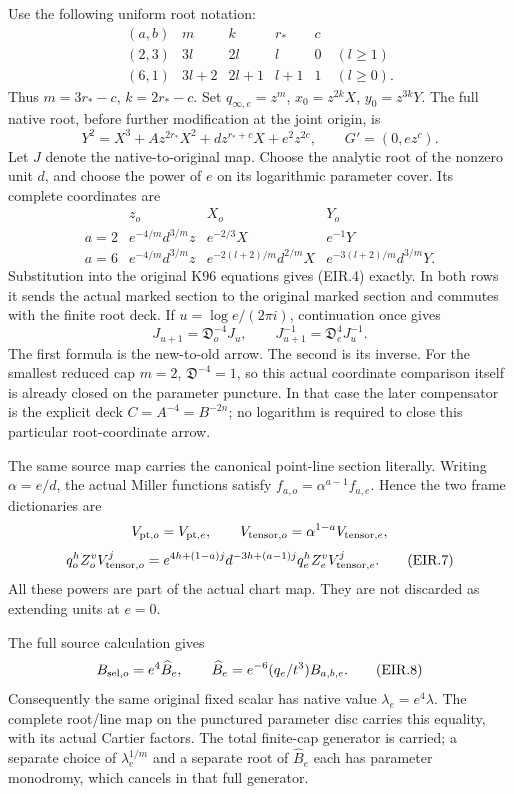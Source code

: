 Use the following uniform root notation:
\[
 \begin{array}{c|cccc}
 (a,b)&m&k&r_*&c\\\hline
 (2,3)&3l&2l&l&0\quad(l\ge1)\\
 (6,1)&3l+2&2l+1&l+1&1\quad(l\ge0).
 \end{array}
\]
Thus \(m=3r_*-c\), \(k=2r_*-c\). Set
\(q_{\infty,e}=z^m\), \(x_0=z^{2k}X\), \(y_0=z^{3k}Y\).
The full native root, before further modification at the joint origin, is
\[
 Y^2=X^3+A z^{2r_*}X^2+d z^{r_*+c}X+e^2z^{2c},
 \qquad G'=(0,ez^c).
 \tag{EIR.4}
\]
Let \(J\) denote the native-to-original map. Choose the analytic root of
the nonzero unit \(d\), and choose the power of \(e\) on its logarithmic
parameter cover. Its complete coordinates are
\[
 \begin{array}{c|ccc}
 &z_o&X_o&Y_o\\\hline
 a=2&e^{-4/m}d^{3/m}z&e^{-2/3}X&e^{-1}Y\\
 a=6&e^{-4/m}d^{3/m}z&
 e^{-2(l+2)/m}d^{2/m}X&e^{-3(l+2)/m}d^{3/m}Y .
 \end{array}
 \tag{EIR.5}
\]
Substitution into the original K96 equations gives (EIR.4) exactly. In
both rows it sends the actual marked section to the original marked
section and commutes with the finite root deck. If
\(u=\log e/(2\pi i)\), continuation once gives
\[
 J_{u+1}=\mathfrak D_o^{-4}J_u,
 \qquad J_{u+1}^{-1}=\mathfrak D_e^{4}J_u^{-1}.
 \tag{EIR.6}
\]
The first formula is the new-to-old arrow. The second is its inverse.
For the smallest reduced cap \(m=2\), \(\mathfrak D^{-4}=1\), so
this actual coordinate comparison itself is already closed on the
parameter puncture. In that case the later compensator is the explicit
deck \(C=A^{-4}=B^{-2n}\); no logarithm is required to close this
particular root-coordinate arrow.

The same source map carries the canonical point-line section literally.
Writing \(\alpha=e/d\), the actual Miller functions satisfy
\(f_{a,o}=\alpha^{a-1}f_{a,e}\). Hence the two frame dictionaries are
\[
 V_{{\rm pt},o}=V_{{\rm pt},e},\qquad
 V_{{\rm tensor},o}=\alpha^{1-a}V_{{\rm tensor},e},
\]
\[
 q_o^h Z_o^v V_{{\rm tensor},o}^j
 =e^{4h+(1-a)j}d^{-3h+(a-1)j}
      q_e^h Z_e^v V_{{\rm tensor},e}^j.
 \tag{EIR.7}
\]
All these powers are part of the actual chart map. They are not
discarded as extending units at \(e=0\).

The full source calculation gives
\[
 B_{{\rm sel},o}=e^4\widehat B_e,\qquad
 \widehat B_e=e^{-6}(q_e/t^3)B_{a,b,e}.
 \tag{EIR.8}
\]
Consequently the same original fixed scalar has native value
\(\lambda_e=e^4\lambda\). The complete root/line map on the punctured
parameter disc carries this equality, with its actual Cartier factors.
The total finite-cap generator is carried; a separate choice of
\(\lambda_e^{1/m}\) and a separate root of \(\widehat B_e\) each has
parameter monodromy, which cancels in that full generator.

